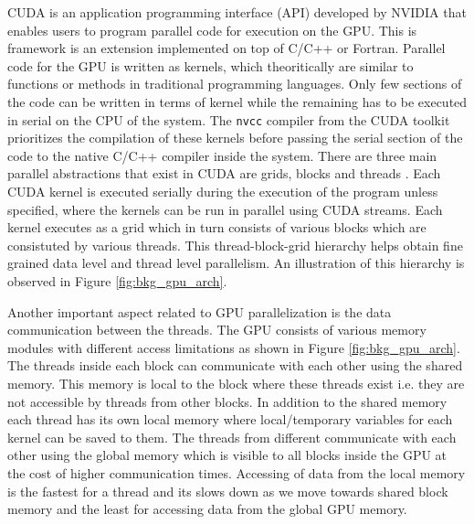 \documentclass[preprint,10pt,authoryear]{elsarticle}
\begin{document}
\begin{linenumbers}
CUDA is an application programming interface (API) developed by NVIDIA \citep{NVIDIA2012} that enables 
users to program parallel code for execution on the GPU. This is framework is an 
extension implemented on top of C/C++ or Fortran. Parallel code for the GPU is written 
as kernels, which theoritically are similar to functions or methods in traditional 
programming languages. Only few sections of the code can be written in terms of kernel 
while the remaining has to be executed in serial on the CPU of the system. The \texttt{nvcc} 
compiler from the CUDA toolkit prioritizes the compilation of these kernels before 
passing the serial section of the code to the native C/C++ compiler inside the system. 
There are three main parallel abstractions that exist in CUDA are grids, blocks and 
threads \citep{santos2013}. Each CUDA kernel is executed serially during the execution 
of the program unless specified, where the kernels can be run in parallel using CUDA 
streams. Each kernel executes as a grid which in turn consists of various blocks which 
are consistuted by various threads. This thread-block-grid hierarchy helps obtain fine 
grained data level and thread level parallelism. An illustration of this hierarchy is 
observed in Figure \ref{fig:bkg_gpu_arch}.

Another important aspect related to GPU parallelization is the data communication between the threads. 
The GPU consists of various memory modules with different access limitations as shown in Figure 
\ref{fig:bkg_gpu_arch}. The threads inside each block can communicate with each other using the 
shared memory. This memory is local to the block where these threads exist i.e. they are not 
accessible by threads from other blocks. In addition to the shared memory each thread has its 
own local memory where local/temporary variables for each kernel can be saved to them. 
The threads from different communicate with each other using the global memory which is visible to 
all blocks inside the GPU at the cost of higher communication times. Accessing of data from the 
local memory is the fastest for a thread and its slows down as we move towards shared block memory 
and the least for accessing data from the global GPU memory. 



\end{linenumbers}
\end{document}
